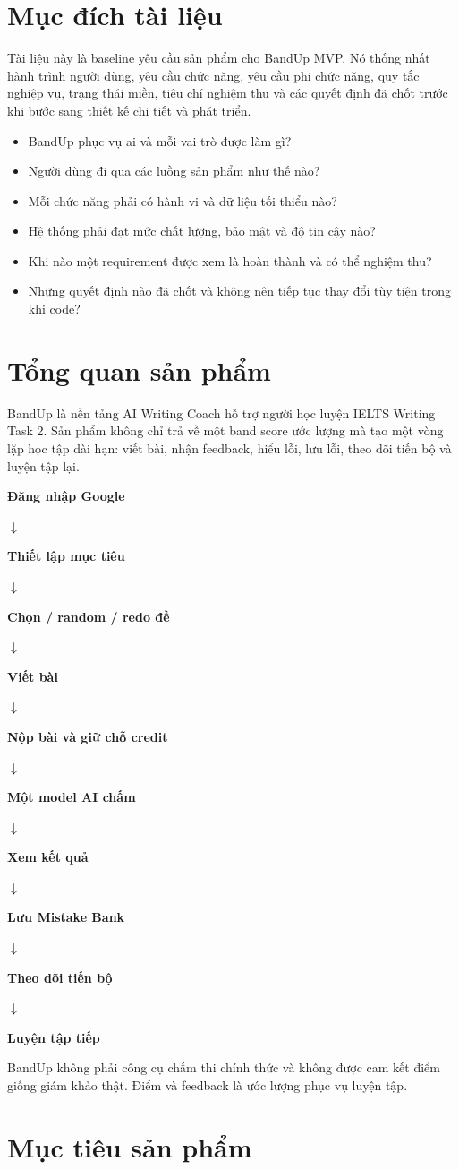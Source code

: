 \documentclass[11pt,a4paper]{article}
\newcommand{\flowarrow}{\par\centering\sffamily\color{BandBlue}\Large$\downarrow$\par}
\newcommand{\flowstep}[1]{\par\centering\sffamily\bfseries #1\par}
\begin{document}
\section*{Mục đích tài liệu}
Tài liệu này là baseline yêu cầu sản phẩm cho BandUp MVP. Nó thống nhất hành trình người dùng, yêu cầu chức năng, yêu cầu phi chức năng, quy tắc nghiệp vụ, trạng thái miền, tiêu chí nghiệm thu và các quyết định đã chốt trước khi bước sang thiết kế chi tiết và phát triển.

\begin{itemize}
  \item BandUp phục vụ ai và mỗi vai trò được làm gì?
  \item Người dùng đi qua các luồng sản phẩm như thế nào?
  \item Mỗi chức năng phải có hành vi và dữ liệu tối thiểu nào?
  \item Hệ thống phải đạt mức chất lượng, bảo mật và độ tin cậy nào?
  \item Khi nào một requirement được xem là hoàn thành và có thể nghiệm thu?
  \item Những quyết định nào đã chốt và không nên tiếp tục thay đổi tùy tiện trong khi code?
\end{itemize}
\section{Tổng quan sản phẩm}
BandUp là nền tảng AI Writing Coach hỗ trợ người học luyện IELTS Writing Task 2. Sản phẩm không chỉ trả về một band score ước lượng mà tạo một vòng lặp học tập dài hạn: viết bài, nhận feedback, hiểu lỗi, lưu lỗi, theo dõi tiến bộ và luyện tập lại.

\begin{flowbox}
\flowstep{Đăng nhập Google}
\flowarrow
\flowstep{Thiết lập mục tiêu}
\flowarrow
\flowstep{Chọn /\allowbreak{} random /\allowbreak{} redo đề}
\flowarrow
\flowstep{Viết bài}
\flowarrow
\flowstep{Nộp bài và giữ chỗ credit}
\flowarrow
\flowstep{Một model AI chấm}
\flowarrow
\flowstep{Xem kết quả}
\flowarrow
\flowstep{Lưu Mistake Bank}
\flowarrow
\flowstep{Theo dõi tiến bộ}
\flowarrow
\flowstep{Luyện tập tiếp}
\end{flowbox}
\begin{importantbox}
BandUp không phải công cụ chấm thi chính thức và không được cam kết điểm giống giám khảo thật. Điểm và feedback là ước lượng phục vụ luyện tập.
\end{importantbox}
\section{Mục tiêu sản phẩm}
\end{document}
